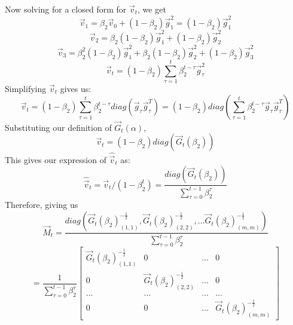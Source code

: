 \begin{enumerate}[(a)]
{\begin{enumerate}[(i)]
{        Now solving for a closed form for $\vec{v}_t$, we get
        \begin{equation}
            \vec{v}_1 = \beta_2\vec{v}_0 + (1 - \beta_2)\vec{g}_1^2 = (1 - \beta_2)\vec{g}_1^2
        \end{equation}
        \begin{equation}
            \vec{v}_2 = \beta_2(1 - \beta_2)\vec{g}_1^2 + (1 - \beta_2)\vec{g}_2^2
        \end{equation}
        \begin{equation}
            \vec{v}_3 = \beta_2^2(1 - \beta_2)\vec{g}_1^2 + \beta_2(1 - \beta_2)\vec{g}_2^2 + (1 - \beta_2)\vec{g}_3^2
        \end{equation}
        \begin{equation}
            \vec{v}_t = (1-\beta_2)\sum_{\tau = 1}^t \beta_2^{t-\tau}\vec{g}_\tau^2
        \end{equation}
        Simplifying $\vec{v}_t$ gives us:
        \begin{equation}
            \vec{v}_t = (1-\beta_2)\sum_{\tau = 1}^t \beta_2^{t-\tau}diag(\vec{g}_\tau \vec{g}_\tau^T) = (1-\beta_2)diag(\sum_{\tau = 1}^t \beta_2^{t-\tau}\vec{g}_\tau \vec{g}_\tau^T)
        \end{equation}
        Substituting our definition of $\vec{G}_t(\alpha)$,
        \begin{equation}
            \vec{v}_t = (1-\beta_2)diag(\vec{G}_t(\beta_2))
        \end{equation}
        This gives our expression of $\hat{\vec{v}}_t$ as:
        \begin{equation}
            \hat{\vec{v}}_t = \vec{v}_t / (1 - \beta_2^t) = \frac{diag(\vec{G}_t(\beta_2))}{\sum_{\tau = 0}^{t-1}\beta_2^\tau}
        \end{equation}
        Therefore, giving us
        \begin{equation}
        \vec{M}_t = \frac{diag(\vec{G}_t(\beta_2)_{(1, 1)}^{-\frac{1}{2}}, \vec{G}_t(\beta_2)_{(2, 2)}^{-\frac{1}{2}}, ... \vec{G}_t(\beta_2)_{(m, m)}^{-\frac{1}{2}} )}{\sum_{\tau = 0}^{t-1}\beta_2^\tau}
        \end{equation}
        \begin{equation}
            =\frac{1}{\sum_{\tau = 0}^{t-1}\beta_2^\tau}\begin{bmatrix}
            \vec{G}_t(\beta_2)_{(1, 1)}^{-\frac{1}{2}} & 0 & ... & 0\\
            0 & \vec{G}_t(\beta_2)_{(2, 2)}^{-\frac{1}{2}} & ... & 0\\
            ... & ... & ... & ...\\
            0 & 0 & ... & \vec{G}_t(\beta_2)_{(m, m)}^{-\frac{1}{2}} 
            \end{bmatrix}
        \end{equation}
        }
        

\end{enumerate}}
\end{enumerate}
